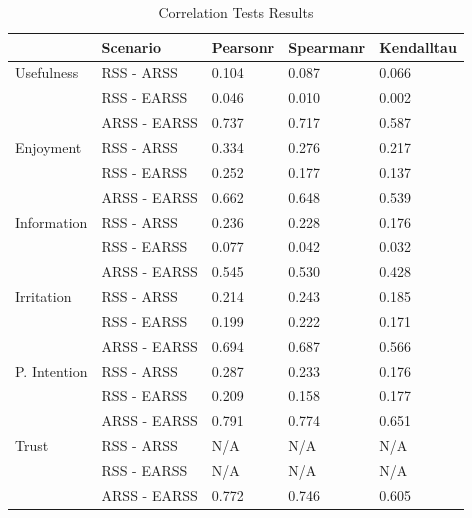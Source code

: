 \documentclass[letterpaper, 10 pt, conference]{ieeeconf}
\begin{document}
\begin{table}[h!]
\begin{tabular}{|l|l|l|l|l|}
\hline
                   & Scenario     & Pearsonr & Spearmanr & Kendalltau \\ \hline
Usefulness         & RSS - ARSS   & 0.104    & 0.087     & 0.066      \\ \hline
                   & RSS - EARSS  & 0.046    & 0.010     & 0.002      \\ \hline
                   & ARSS - EARSS & 0.737    & 0.717     & 0.587      \\ \hline
Enjoyment          & RSS - ARSS   & 0.334    & 0.276     & 0.217      \\ \hline
                   & RSS - EARSS  & 0.252    & 0.177     & 0.137      \\ \hline
                   & ARSS - EARSS & 0.662    & 0.648     & 0.539      \\ \hline
Information        & RSS - ARSS   & 0.236    & 0.228     & 0.176      \\ \hline
                   & RSS - EARSS  & 0.077    & 0.042     & 0.032      \\ \hline
                   & ARSS - EARSS & 0.545    & 0.530     & 0.428      \\ \hline
Irritation         & RSS - ARSS   & 0.214    & 0.243     & 0.185      \\ \hline
                   & RSS - EARSS  & 0.199    & 0.222     & 0.171      \\ \hline
                   & ARSS - EARSS & 0.694    & 0.687     & 0.566      \\ \hline
P. Intention & RSS - ARSS   & 0.287    & 0.233     & 0.176      \\ \hline
                   & RSS - EARSS  & 0.209    & 0.158     & 0.177      \\ \hline
                   & ARSS - EARSS & 0.791    & 0.774     & 0.651      \\ \hline
Trust              & RSS - ARSS   & N/A      & N/A       & N/A        \\ \hline
                   & RSS - EARSS  & N/A      & N/A       & N/A        \\ \hline
                   & ARSS - EARSS & 0.772    & 0.746     & 0.605      \\ \hline
\end{tabular}
\caption{\label{table}Correlation Tests Results}
\end{table}
\end{document}

